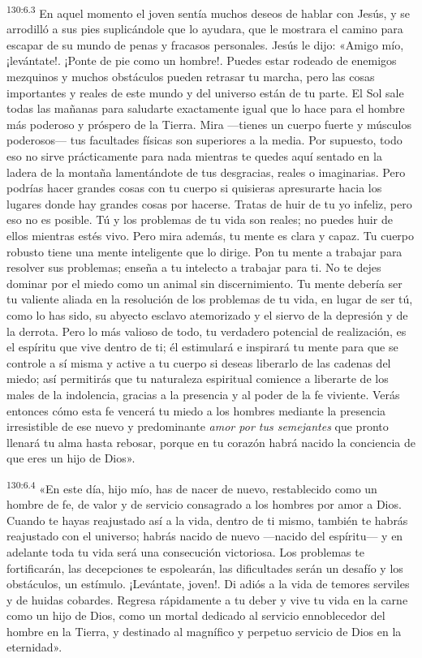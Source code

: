 \par 
\textsuperscript{130:6.3} En aquel momento el joven sentía muchos deseos de hablar con Jesús, y se arrodilló a sus pies suplicándole que lo ayudara, que le mostrara el camino para escapar de su mundo de penas y fracasos personales. Jesús le dijo: «Amigo mío, ¡levántate!. ¡Ponte de pie como un hombre!. Puedes estar rodeado de enemigos mezquinos y muchos obstáculos pueden retrasar tu marcha, pero las cosas importantes y reales de este mundo y del universo están de tu parte. El Sol sale todas las mañanas para saludarte exactamente igual que lo hace para el hombre más poderoso y próspero de la Tierra. Mira ---tienes un cuerpo fuerte y músculos poderosos--- tus facultades físicas son superiores a la media. Por supuesto, todo eso no sirve prácticamente para nada mientras te quedes aquí sentado en la ladera de la montaña lamentándote de tus desgracias, reales o imaginarias. Pero podrías hacer grandes cosas con tu cuerpo si quisieras apresurarte hacia los lugares donde hay grandes cosas por hacerse. Tratas de huir de tu yo infeliz, pero eso no es posible. Tú y los problemas de tu vida son reales; no puedes huir de ellos mientras estés vivo. Pero mira además, tu mente es clara y capaz. Tu cuerpo robusto tiene una mente inteligente que lo dirige. Pon tu mente a trabajar para resolver sus problemas; enseña a tu intelecto a trabajar para ti. No te dejes dominar por el miedo como un animal sin discernimiento. Tu mente debería ser tu valiente aliada en la resolución de los problemas de tu vida, en lugar de ser tú, como lo has sido, su abyecto esclavo atemorizado y el siervo de la depresión y de la derrota. Pero lo más valioso de todo, tu verdadero potencial de realización, es el espíritu que vive dentro de ti; él estimulará e inspirará tu mente para que se controle a sí misma y active a tu cuerpo si deseas liberarlo de las cadenas del miedo; así permitirás que tu naturaleza espiritual comience a liberarte de los males de la indolencia, gracias a la presencia y al poder de la fe viviente. Verás entonces cómo esta fe vencerá tu miedo a los hombres mediante la presencia irresistible de ese nuevo y predominante \textit{amor por tus semejantes} que pronto llenará tu alma hasta rebosar, porque en tu corazón habrá nacido la conciencia de que eres un hijo de Dios».

\par 
\textsuperscript{130:6.4} «En este día, hijo mío, has de nacer de nuevo, restablecido como un hombre de fe, de valor y de servicio consagrado a los hombres por amor a Dios. Cuando te hayas reajustado así a la vida, dentro de ti mismo, también te habrás reajustado con el universo; habrás nacido de nuevo ---nacido del espíritu--- y en adelante toda tu vida será una consecución victoriosa. Los problemas te fortificarán, las decepciones te espolearán, las dificultades serán un desafío y los obstáculos, un estímulo. ¡Levántate, joven!. Di adiós a la vida de temores serviles y de huidas cobardes. Regresa rápidamente a tu deber y vive tu vida en la carne como un hijo de Dios, como un mortal dedicado al servicio ennoblecedor del hombre en la Tierra, y destinado al magnífico y perpetuo servicio de Dios en la eternidad».

